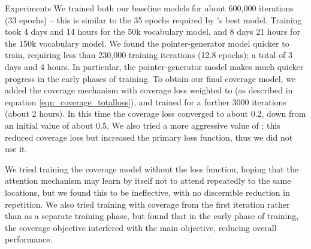 \documentclass[11pt,a4paper]{article}
\begin{document}
\begin{section}{Experiments}
We trained both our baseline models for about 600,000 iterations (33 epochs) -- this is similar to the 35 epochs required by \citeauthor{nallapati2016abstractive}'s  best model. 
Training took 4 days and 14 hours for the 50k vocabulary model, and 8 days 21 hours for the 150k vocabulary model.
We found the pointer-generator model quicker to train, requiring less than 230,000 training iterations (12.8 epochs); a total of 3 days and 4 hours.
In particular, the pointer-generator model makes much quicker progress in the early phases of training.
To obtain our final coverage model, we added the coverage mechanism with coverage loss weighted to  (as described in equation \ref{eqn_coverage_totalloss}), and trained for a further 3000 iterations (about 2 hours).
In this time the coverage loss converged to about 0.2, down from an initial value of about 0.5.
We also tried a more aggressive value of ; this reduced coverage loss but increased the primary loss function, thus we did not use it.

We tried training the coverage model without the loss function, hoping that the attention mechanism may learn by itself not to attend repeatedly to the same locations, but we found this to be ineffective, with no discernible reduction in repetition.
We also tried training with coverage from the first iteration rather than as a separate training phase, but found that in the early phase of training, the coverage objective interfered with the main objective, reducing overall performance.
\end{section}
\end{document}
